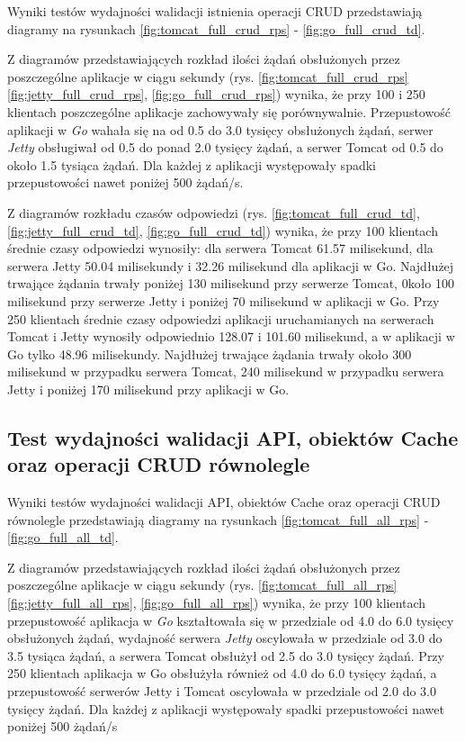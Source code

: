 Wyniki testów wydajności walidacji istnienia operacji CRUD przedstawiają diagramy na rysunkach \ref{fig:tomcat_full_crud_rps} - \ref{fig:go_full_crud_td}.

Z diagramów przedstawiających rozkład ilości żądań obsłużonych przez poszczególne aplikacje w ciągu sekundy (rys. \ref{fig:tomcat_full_crud_rps} \ref{fig:jetty_full_crud_rps}, \ref{fig:go_full_crud_rps}) wynika, że przy 100 i 250 klientach poszczególne aplikacje zachowywały się porównywalnie. Przepustowość aplikacji w \textsl{Go} wahała się na od 0.5 do 3.0 tysięcy obsłużonych żądań, serwer \textsl{Jetty} obsługiwał od 0.5 do ponad 2.0 tysięcy żądań, a serwer Tomcat od 0.5 do około 1.5 tysiąca żądań. Dla każdej z aplikacji występowały spadki przepustowości nawet poniżej 500 żądań/s.

Z diagramów rozkładu czasów odpowiedzi (rys. \ref{fig:tomcat_full_crud_td}, \ref{fig:jetty_full_crud_td}, \ref{fig:go_full_crud_td}) wynika, że przy 100 klientach średnie czasy odpowiedzi wynosiły: dla serwera Tomcat 61.57 milisekund, dla serwera Jetty 50.04 milisekundy i 32.26 milisekund dla aplikacji w Go. Najdłużej trwające żądania trwały poniżej 130 milisekund przy serwerze Tomcat, 0koło 100 milisekund przy serwerze Jetty i poniżej 70 milisekund w aplikacji w Go. Przy 250 klientach średnie czasy odpowiedzi aplikacji uruchamianych na serwerach Tomcat i Jetty  wynosiły odpowiednio 128.07 i 101.60 milisekund, a w aplikacji w Go tylko 48.96 milisekundy. Najdłużej trwające żądania trwały około 300 milisekund w przypadku serwera Tomcat, 240 milisekund w przypadku serwera Jetty i poniżej 170 milisekund przy aplikacji w Go. 


\clearpage

\subsection{Test wydajności walidacji API, obiektów Cache oraz operacji CRUD równolegle }

Wyniki testów wydajności walidacji API, obiektów Cache oraz operacji CRUD równolegle przedstawiają diagramy na rysunkach \ref{fig:tomcat_full_all_rps} - \ref{fig:go_full_all_td}.              

Z diagramów przedstawiających rozkład ilości żądań obsłużonych przez poszczególne aplikacje w ciągu sekundy  (rys. \ref{fig:tomcat_full_all_rps} \ref{fig:jetty_full_all_rps}, \ref{fig:go_full_all_rps}) wynika, że przy 100 klientach przepustowość aplikacja w \textsl{Go} kształtowała się w przedziale od 4.0 do 6.0 tysięcy obsłużonych żądań, wydajność serwera \textsl{Jetty} oscylowała w przedziale od 3.0 do 3.5 tysiąca  żądań, a  serwera Tomcat  obsłużył od 2.5 do 3.0 tysięcy żądań. Przy 250 klientach aplikacja w Go obsłużyła również od 4.0 do 6.0 tysięcy żądań, a przepustowość serwerów Jetty i Tomcat oscylowała w przedziale od 2.0 do 3.0 tysięcy żądań. Dla każdej z aplikacji występowały spadki przepustowości nawet poniżej 500 żądań/s

